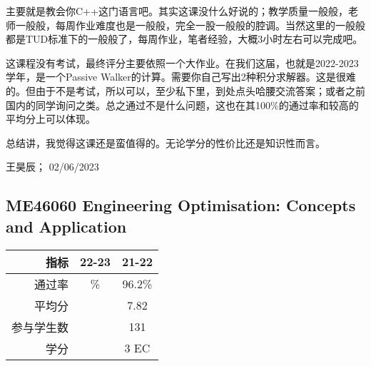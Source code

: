 主要就是教会你C++这门语言吧。其实这课没什么好说的；教学质量一般般，老师一般般，每周作业难度也是一般般，完全一股一般般的腔调。当然这里的一般般都是TUD标准下的一般般了，每周作业，笔者经验，大概3小时左右可以完成吧。

这课程没有考试，最终评分主要依照一个大作业。在我们这届，也就是2022-2023学年，是一个Passive Walker的计算。需要你自己写出2种积分求解器。这是很难的。但由于不是考试，所以可以，至少私下里，到处点头哈腰交流答案；或者之前国内的同学询问之类。总之通过不是什么问题，这也在其100\%的通过率和较高的平均分上可以体现。

总结讲，我觉得这课还是蛮值得的。无论学分的性价比还是知识性而言。
\begin{flushright}
王昊辰； 02/06/2023
\end{flushright}


\subsection[ME46060 Engineering Optimisation: Concepts and Application]{ME46060 Engineering Optimisation: Concepts and Application}
\begin{minipage}{0.45\textwidth}
\raggedleft
\begin{tabular}{r|c|c}
\textbf{指标} & \textbf{22-23}& \textbf{21-22} \\ \hline
通过率 &\% & 96.2\% \\ 
平均分 & & 7.82 \\ 
参与学生数&  & 131 \\
学分 & & 3 EC\\
\end{tabular}
\end{minipage}\\

